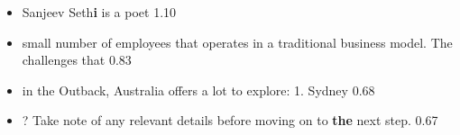 \begin{itemize}[leftmargin=*,itemsep=0pt]
\item Sanjeev Seth\textbf{\textcolor{chatframe}{i}} is a poet \hfill 1.10
\item small number of employees that operates in a traditional business model. \textbf{\textcolor{chatframe}{}}The challenges that \hfill 0.83
\item in the Outback, Australia offers a lot to explore: \textbf{\textcolor{chatframe}{}}1. Sydney \hfill 0.68
\item ? Take note of any relevant details before moving on to \textbf{\textcolor{chatframe}{the}} next step. \hfill 0.67
\end{itemize}
